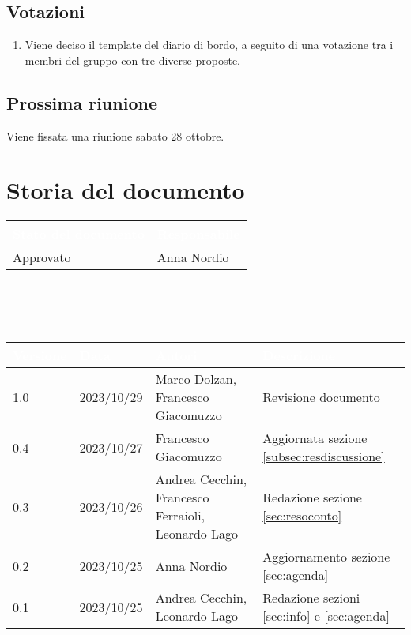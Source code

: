 \documentclass[12pt]{article}
\begin{document}
\begin{enumerate}
\end{enumerate}

\subsection{Votazioni} \label{subsec:resvotazione}
\begin{enumerate}
    \item Viene deciso il template del diario di bordo, a seguito di una votazione tra i membri del gruppo con tre diverse proposte.
\end{enumerate}

\subsection{Prossima riunione} \label{subsec:riunione}
Viene fissata una riunione sabato 28 ottobre.

\section{Storia del documento} \label{sec:storia}
\begingroup
\setlength{\tabcolsep}{10pt}
\renewcommand{\arraystretch}{1.5}
\begin{tabularx}{\textwidth}{| X | X |}
    \hline
    \rowcolor{headerrow} \textbf{\textcolor{white}{Stato del documento}} & \textbf{\textcolor{white}{Responsabile}} \\
    \hline
    Approvato &Anna Nordio\\
    \hline   
\end{tabularx}
\\\\\\
\begin{tabularx}{\textwidth}{| l | l | X | X |}
    \hline
    \rowcolor{headerrow} \textbf{\textcolor{white}{Versione}} & \textbf{\textcolor{white}{Data}} & \textbf{\textcolor{white}{Autori}} & \textbf{\textcolor{white}{Descrizione}} \\
    \hline
    1.0 & 2023/10/29 & Marco Dolzan, Francesco Giacomuzzo & Revisione documento \\
    \hline
    0.4 & 2023/10/27 & Francesco Giacomuzzo & Aggiornata sezione \ref{subsec:resdiscussione}\\
    \hline
    0.3 & 2023/10/26 & Andrea Cecchin, Francesco Ferraioli, Leonardo Lago & Redazione sezione \ref{sec:resoconto}\\
    \hline
    0.2 & 2023/10/25 & Anna Nordio & Aggiornamento sezione \ref{sec:agenda}\\
    \hline
    0.1 & 2023/10/25 & Andrea Cecchin, Leonardo Lago & Redazione sezioni \ref{sec:info} e \ref{sec:agenda}\\
    \hline
\end{tabularx}
\endgroup
\end{document}
